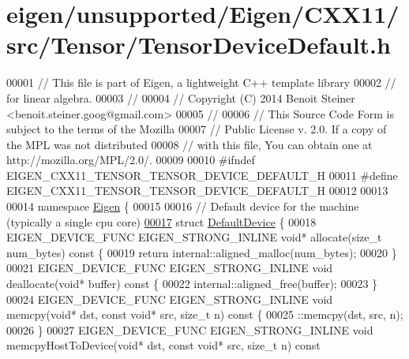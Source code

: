 \hypertarget{eigen_2unsupported_2_eigen_2_c_x_x11_2src_2_tensor_2_tensor_device_default_8h_source}{}\section{eigen/unsupported/\+Eigen/\+C\+X\+X11/src/\+Tensor/\+Tensor\+Device\+Default.h}
\label{eigen_2unsupported_2_eigen_2_c_x_x11_2src_2_tensor_2_tensor_device_default_8h_source}

\begin{DoxyCode}
00001 \textcolor{comment}{// This file is part of Eigen, a lightweight C++ template library}
00002 \textcolor{comment}{// for linear algebra.}
00003 \textcolor{comment}{//}
00004 \textcolor{comment}{// Copyright (C) 2014 Benoit Steiner <benoit.steiner.goog@gmail.com>}
00005 \textcolor{comment}{//}
00006 \textcolor{comment}{// This Source Code Form is subject to the terms of the Mozilla}
00007 \textcolor{comment}{// Public License v. 2.0. If a copy of the MPL was not distributed}
00008 \textcolor{comment}{// with this file, You can obtain one at http://mozilla.org/MPL/2.0/.}
00009 
00010 \textcolor{preprocessor}{#ifndef EIGEN\_CXX11\_TENSOR\_TENSOR\_DEVICE\_DEFAULT\_H}
00011 \textcolor{preprocessor}{#define EIGEN\_CXX11\_TENSOR\_TENSOR\_DEVICE\_DEFAULT\_H}
00012 
00013 
00014 \textcolor{keyword}{namespace }\hyperlink{namespace_eigen}{Eigen} \{
00015 
00016 \textcolor{comment}{// Default device for the machine (typically a single cpu core)}
\hyperlink{struct_eigen_1_1_default_device}{00017} \textcolor{keyword}{struct }\hyperlink{struct_eigen_1_1_default_device}{DefaultDevice} \{
00018   EIGEN\_DEVICE\_FUNC EIGEN\_STRONG\_INLINE \textcolor{keywordtype}{void}* allocate(\textcolor{keywordtype}{size\_t} num\_bytes)\textcolor{keyword}{ const }\{
00019     \textcolor{keywordflow}{return} internal::aligned\_malloc(num\_bytes);
00020   \}
00021   EIGEN\_DEVICE\_FUNC EIGEN\_STRONG\_INLINE \textcolor{keywordtype}{void} deallocate(\textcolor{keywordtype}{void}* buffer)\textcolor{keyword}{ const }\{
00022     internal::aligned\_free(buffer);
00023   \}
00024   EIGEN\_DEVICE\_FUNC EIGEN\_STRONG\_INLINE \textcolor{keywordtype}{void} memcpy(\textcolor{keywordtype}{void}* dst, \textcolor{keyword}{const} \textcolor{keywordtype}{void}* src, \textcolor{keywordtype}{size\_t} n)\textcolor{keyword}{ const }\{
00025     ::memcpy(dst, src, n);
00026   \}
00027   EIGEN\_DEVICE\_FUNC EIGEN\_STRONG\_INLINE \textcolor{keywordtype}{void} memcpyHostToDevice(\textcolor{keywordtype}{void}* dst, \textcolor{keyword}{const} \textcolor{keywordtype}{void}* src, \textcolor{keywordtype}{size\_t} n)\textcolor{keyword}{ const
}
\end{DoxyCode}
